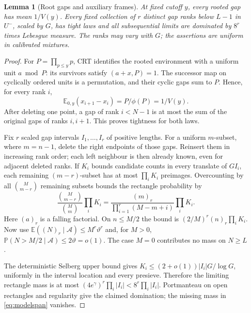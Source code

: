\documentclass[11pt,a4paper]{article}
\newtheorem{lemma}[theorem]{Lemma}
\newcommand{\E}{\mathbb E}
\newcommand{\Prob}{\mathbb P}
\begin{document}
\begin{lemma}[Root gaps and auxiliary frames]\label{lem:localspacings}
At fixed cutoff $y$, every rooted gap has mean $1/V(y)$.
Every fixed collection of $r$ distinct gap ranks below $L-1$ in $U^-$,
scaled by $G$, has tight laws and all subsequential limits are
dominated by $8^r$ times Lebesgue measure. The ranks may vary with $G$;
the assertions are uniform in calibrated mixtures.
\end{lemma}
\begin{proof}
For $P=\prod_{p\le y}p$, CRT identifies the rooted environment with
a uniform unit $a\bmod P$: its survivors satisfy $(a+x,P)=1$.
The successor map on cyclically ordered units is a permutation,
and their cyclic gaps sum to $P$. Hence, for every rank $i$,
\[
                \E_{0,y}(x_{i+1}-x_i)=P/\phi(P)=1/V(y).
\]
After deleting one point, a gap of rank $i<N-1$ is at most the
sum of the original gaps of ranks $i,i+1$. This proves tightness
for both laws.

Fix $r$ scaled gap intervals $I_1,\ldots,I_r$ of positive lengths.
For a uniform $m$-subset, where $m=n-1$, delete the right
endpoints of those gaps. Reinsert them in increasing rank order;
each left neighbour is then already known, even for adjacent
deleted ranks. If $K_i$ bounds candidate counts in every translate
of $GI_i$, each remaining $(m-r)$-subset has at most $\prod_iK_i$
preimages. Overcounting by all $\binom M{m-r}$ remaining subsets bounds
the rectangle probability by
\[
 \frac{\binom M{m-r}}{\binom Mm}\prod_iK_i
 =\frac{(m)_r}{\prod_{i=1}^r(M-m+i)}\prod_iK_i.
\]
Here $(a)_r$ is a falling factorial. On $n\le M/2$ the bound is
$(2/M)^r(n)_r\prod_iK_i$. Now use
$\E((N)_r\mid\mathcal A)\le M^r\vartheta^r$ and, for $M>0$,
$\Prob(N>M/2\mid\mathcal A)\le2\vartheta=o(1)$.
The case $M=0$ contributes no mass on $N\ge L$.

The deterministic Selberg upper bound gives
$K_i\le(2+o(1))|I_i|G/\log G$, uniformly in the interval location
and every presieve. Therefore the limiting rectangle mass is
at most $(4e^\gamma)^r\prod_i|I_i|<8^r\prod_i|I_i|$.
Portmanteau on open rectangles and regularity give the claimed
domination; the missing mass in \eqref{eq:modelspan} vanishes.
\end{proof}
\end{document}
